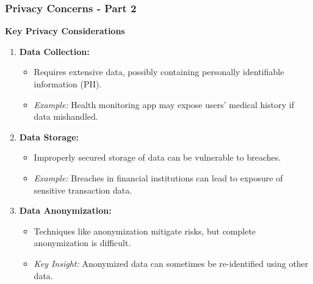 \documentclass[aspectratio=169]{beamer}
\begin{document}
\begin{frame}[fragile]
    \frametitle{Privacy Concerns - Part 2}
    \textbf{Key Privacy Considerations}
    \begin{enumerate}
        \item \textbf{Data Collection:} 
            \begin{itemize}
                \item Requires extensive data, possibly containing personally identifiable information (PII).
                \item \textit{Example:} Health monitoring app may expose users' medical history if data mishandled.
            \end{itemize}
        
        \item \textbf{Data Storage:} 
            \begin{itemize}
                \item Improperly secured storage of data can be vulnerable to breaches.
                \item \textit{Example:} Breaches in financial institutions can lead to exposure of sensitive transaction data.
            \end{itemize}
        
        \item \textbf{Data Anonymization:}
            \begin{itemize}
                \item Techniques like anonymization mitigate risks, but complete anonymization is difficult.
                \item \textit{Key Insight:} Anonymized data can sometimes be re-identified using other data.
            \end{itemize}
    \end{enumerate}
\end{frame}
\end{document}

